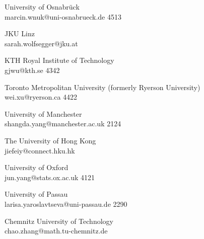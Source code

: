 \begin{multicols}{2}
 {University of Osnabr\"{u}ck\\}%
 {marcin.wnuk@uni-osnabrueck.de}%
 {4513} %
 {} %
 {} %
 {} %
 {} %

 {JKU Linz\\}%
 {sarah.wolfsegger@jku.at}%
 {} %
 {} %
 {} %
 {} %
 {} %

 {KTH Royal Institute of Technology\\}%
 {gjwu@kth.se}%
 {4342} %
 {} %
 {} %
 {} %
 {} %

 {Toronto Metropolitan University (formerly Ryerson University)\\}%
 {wei.xu@ryerson.ca}%
 {4422} %
 {} %
 {} %
 {} %
 {} %

 {University of Manchester\\}%
 {shangda.yang@manchester.ac.uk}%
 {2124} %
 {} %
 {} %
 {} %
 {} %

 {The University of Hong Kong\\}%
 {jiefeiy@connect.hku.hk}%
 {} %
 {} %
 {} %
 {} %
 {} %

 {University of Oxford\\}%
 {jun.yang@stats.ox.ac.uk}%
 {4121} %
 {} %
 {} %
 {} %
 {} %

 {University of Passau\\}%
 {larisa.yaroslavtseva@uni-passau.de}%
 {2290} %
 {} %
 {} %
 {} %
 {} %

 {Chemnitz University of Technology\\}%
 {chao.zhang@math.tu-chemnitz.de}%
 {} %
 {} %
 {} %
 {} %
 {} %


\end{multicols}
